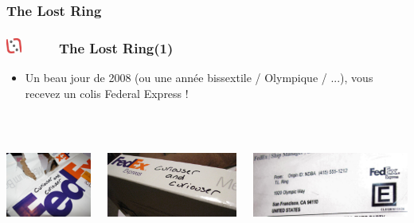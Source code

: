 \documentclass[slidetop,11pt]{beamer}
\def\sectionPartIIaIV{The Lost Ring}
\def\moreInFrameTitleLeftt{\includegraphics[height=0.5cm]{img/ligueludique-0.png}~~~~~}
\begin{document}
\subsubsection{\sectionPartIIaIV} %
\begin{frame}
	\frametitle{\moreInFrameTitleLeftt \sectionPartIIaIV  (1) }
	\begin{itemize}
		\item Un beau jour de 2008 (ou une ann{\'e}e bissextile / Olympique / ...), vous recevez un colis Federal Express !
	\end{itemize}
	
	\begin{columns}[T]
		\begin{column}[T]{4.1cm}
			\includegraphics[height=4.05cm]{img/argTheLostRing/2298573987_7e11345d9d_o.jpg}
		\end{column}
		\begin{column}[T]{4.1cm}
			\includegraphics[height=4.05cm]{img/argTheLostRing/2299370570_92295d5e5f_o.jpg}
		\end{column}
		\begin{column}[T]{4.1cm}
			\includegraphics[height=4.05cm]{img/argTheLostRing/2298573877_5b74530a72_o.jpg}
		\end{column}
	\end{columns}
\end{frame} 
\end{document}

